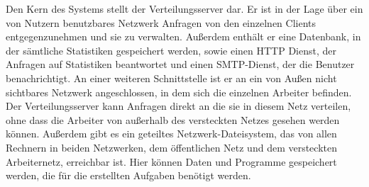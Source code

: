 \documentclass[a4paper,12pt]{article}
\begin{document}
Den Kern des Systems stellt der Verteilungsserver dar. Er ist in der Lage über ein von Nutzern benutzbares Netzwerk Anfragen von den einzelnen Clients entgegenzunehmen und sie zu verwalten.
Außerdem enthält er eine Datenbank, in der sämtliche Statistiken gespeichert werden, sowie einen HTTP Dienst, der Anfragen auf Statistiken beantwortet und einen SMTP-Dienst, der die Benutzer benachrichtigt. An einer weiteren Schnittstelle ist er an ein von Außen nicht sichtbares Netzwerk angeschlossen, in dem sich die einzelnen Arbeiter befinden. Der Verteilungsserver kann Anfragen direkt an die sie in diesem Netz verteilen, ohne dass die Arbeiter von außerhalb des versteckten Netzes gesehen werden können. Außerdem gibt es ein geteiltes Netzwerk-Dateisystem, das von allen Rechnern in beiden Netzwerken, dem öffentlichen Netz und dem versteckten Arbeiternetz, erreichbar ist. Hier können Daten und Programme gespeichert werden, die für die erstellten Aufgaben benötigt werden.


\clearpage
\end{document}
